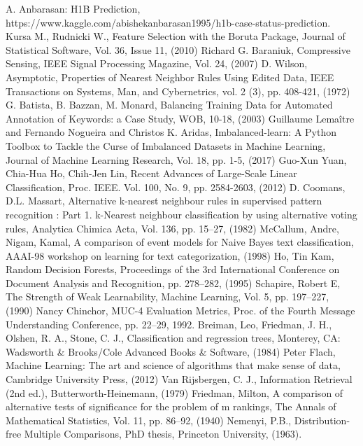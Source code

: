 \begin{thebibliography}{}
%
%

A. Anbarasan: H1B Prediction, https://www.kaggle.com/abishekanbarasan1995/h1b-case-status-prediction.
Kursa M., Rudnicki W., Feature Selection with the Boruta Package,  Journal of Statistical Software, Vol. 36, Issue 11, (2010)
Richard G. Baraniuk, Compressive Sensing, IEEE Signal Processing Magazine, Vol. 24, (2007)
D. Wilson, Asymptotic, Properties of Nearest Neighbor Rules Using Edited Data, IEEE Transactions on Systems, Man, and Cybernetrics, vol. 2 (3), pp. 408-421, (1972)
G. Batista, B. Bazzan, M. Monard, Balancing Training Data for Automated Annotation of Keywords: a Case Study, WOB, 10-18, (2003)
Guillaume  Lema{{\^i}}tre and Fernando Nogueira and Christos K. Aridas, Imbalanced-learn: A Python Toolbox to Tackle the Curse of Imbalanced Datasets in Machine Learning, Journal of Machine Learning Research, Vol. 18, pp. 1-5, (2017)
Guo-Xun Yuan, Chia-Hua Ho, Chih-Jen Lin, Recent Advances of Large-Scale Linear Classification, Proc. IEEE. Vol. 100, No. 9, pp. 2584-2603, (2012)
D. Coomans, D.L. Massart, Alternative k-nearest neighbour rules in supervised pattern recognition : Part 1. k-Nearest neighbour classification by using alternative voting rules, Analytica Chimica Acta, Vol. 136, pp. 15–27,  (1982)
McCallum, Andre, Nigam, Kamal, A comparison of event models for Naive Bayes text classification, AAAI-98 workshop on learning for text categorization,  (1998)
Ho, Tin Kam, Random Decision Forests, Proceedings of the 3rd International Conference on Document Analysis and Recognition, pp. 278–282, (1995)
Schapire, Robert E, The Strength of Weak Learnability, Machine Learning, Vol. 5, pp. 197–227, (1990) 
Nancy Chinchor, MUC-4 Evaluation Metrics, Proc. of the Fourth Message Understanding Conference, pp. 22–29, 1992.
Breiman, Leo, Friedman, J. H., Olshen, R. A., Stone, C. J., Classification and regression trees, Monterey, CA: Wadsworth \& Brooks/Cole Advanced Books \& Software, (1984)
Peter Flach, Machine Learning: The art and science of algorithms that make sense of data, Cambridge University Press, (2012)
Van Rijsbergen, C. J., Information Retrieval (2nd ed.), Butterworth-Heinemann, (1979)
Friedman, Milton, A comparison of alternative tests of significance for the problem of m rankings, The Annals of Mathematical Statistics, Vol. 11, pp. 86–92, (1940)
Nemenyi, P.B., Distribution-free Multiple Comparisons, PhD thesis, Princeton University, (1963).
\end{thebibliography}


